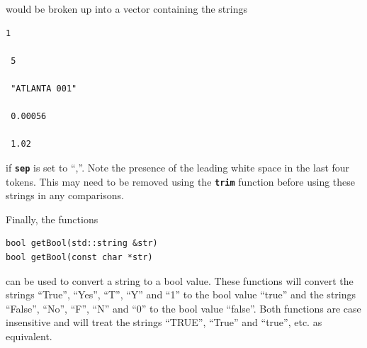 would be broken up into a vector containing the strings

{
\color{red}
\begin{Verbatim}[fontseries=b]
1

 5

 "ATLANTA 001"

 0.00056

 1.02
\end{Verbatim}
}
if \texttt{\textbf{sep}} is set to ``,''.
Note the presence of the leading white space in the last four tokens. This may
need to be removed using the \texttt{\textbf{trim}} function before using these
strings in any comparisons.

Finally, the functions

{
\color{red}
\begin{Verbatim}[fontseries=b]
bool getBool(std::string &str)
bool getBool(const char *str)
\end{Verbatim}
}

can be used to convert a string to a bool value. These functions
will convert the strings ``True'', ``Yes'', ``T'', ``Y'' and ``1'' to
the bool value ``true'' and the strings ``False'', ``No'', ``F'', ``N'' and
``0'' to the bool value ``false''. Both functions are case insensitive and will
treat the strings ``TRUE'', ``True'' and ``true'', etc. as equivalent.
